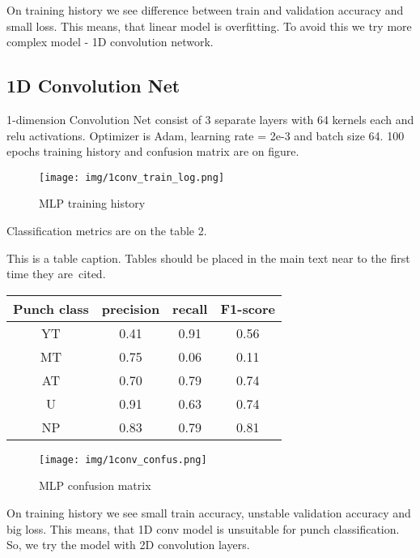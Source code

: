 \documentclass[sport,article,submit,moreauthors,pdftex]{Definitions/mdpi}
\begin{document}
On training history we see difference between train and validation accuracy and small loss.
This means, that linear model is overfitting.
To avoid this we try more complex model - 1D convolution network.


\subsection{1D Convolution Net}
1-dimension Convolution Net consist of 3 separate layers with 64 kernels each and relu activations. 
Optimizer is Adam, learning rate = 2e-3 and batch size 64.
100 epochs training history and confusion matrix are on figure.

\begin{figure}[H]
\texttt{[image: img/1conv\_train\_log.png]}
\caption{MLP training history}
\end{figure} 

Classification metrics are on the table 2.

\begin{specialtable}[H] 
\caption{This is a table caption. Tables should be placed in the main text near to the first time they are~cited.\label{tab2}}
\begin{tabular}{cccc}
\toprule
\textbf{Punch class}	& \textbf{precision}	& \textbf{recall}	& \textbf{F1-score}\\
\midrule
YT		& 0.41		& 0.91		& 0.56 \\
MT		& 0.75		& 0.06		& 0.11 \\
AT		& 0.70		& 0.79		& 0.74 \\
U		& 0.91		& 0.63		& 0.74 \\
NP		& 0.83		& 0.79		& 0.81 \\
\bottomrule
\end{tabular}
\end{specialtable}

\begin{figure}[H]
\texttt{[image: img/1conv\_confus.png]}
\caption{MLP confusion matrix}
\end{figure} 

On training history we see small train accuracy, unstable validation accuracy and big loss.
This means, that 1D conv model is unsuitable for punch classification.
So, we try the model with 2D convolution layers.

\end{document}
